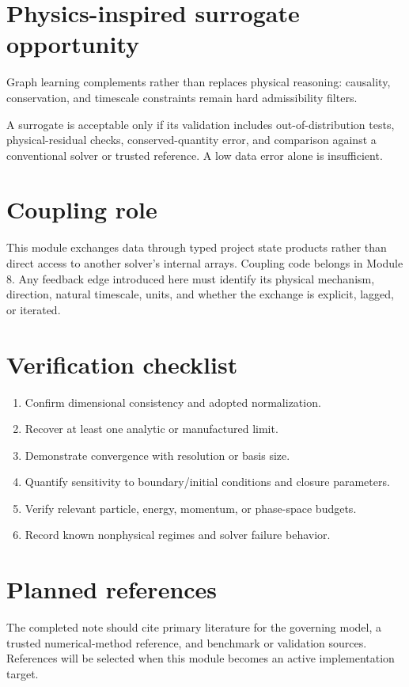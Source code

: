 \documentclass[11pt]{article}
\begin{document}
\section{Physics-inspired surrogate opportunity}
Graph learning complements rather than replaces physical reasoning: causality, conservation, and timescale constraints remain hard admissibility filters.

A surrogate is acceptable only if its validation includes out-of-distribution tests, physical-residual checks, conserved-quantity error, and comparison against a conventional solver or trusted reference. A low data error alone is insufficient.

\section{Coupling role}
This module exchanges data through typed project state products rather than direct access to another solver's internal arrays. Coupling code belongs in Module 8. Any feedback edge introduced here must identify its physical mechanism, direction, natural timescale, units, and whether the exchange is explicit, lagged, or iterated.

\section{Verification checklist}
\begin{enumerate}[leftmargin=1.6em]
\item Confirm dimensional consistency and adopted normalization.
\item Recover at least one analytic or manufactured limit.
\item Demonstrate convergence with resolution or basis size.
\item Quantify sensitivity to boundary/initial conditions and closure parameters.
\item Verify relevant particle, energy, momentum, or phase-space budgets.
\item Record known nonphysical regimes and solver failure behavior.
\end{enumerate}

\section{Planned references}
The completed note should cite primary literature for the governing model, a trusted numerical-method reference, and benchmark or validation sources. References will be selected when this module becomes an active implementation target.
\end{document}
